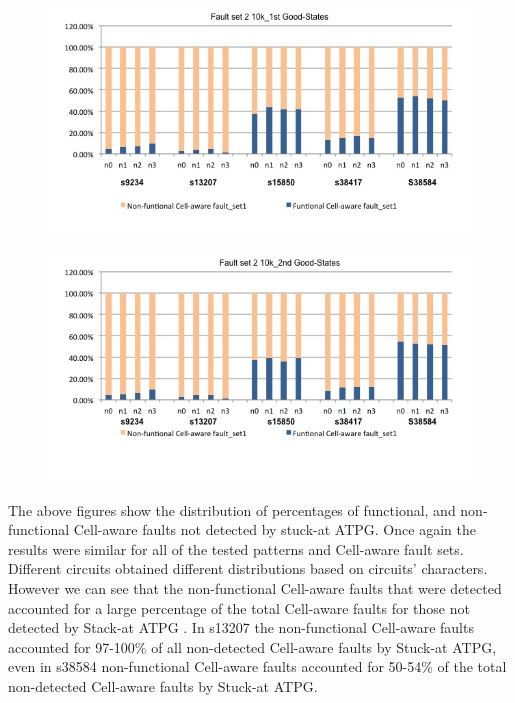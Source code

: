 \documentclass[10 pt, technote]{IEEEtran}
\begin{document}
\begin{figure}[H]
\includegraphics[scale=0.2,width = \linewidth]{../Figures/distribution_set2_10k_1st.jpg}
\end{figure}

\begin{figure}[H]
\includegraphics[scale=0.2,width = \linewidth]{../Figures/distribution_set2_10k_2nd.jpg}
\end{figure}

The above figures show the distribution of percentages of functional, and non-functional Cell-aware faults not detected by stuck-at ATPG. Once again the results were similar for all of the tested patterns and Cell-aware fault sets. Different circuits obtained different distributions based on circuits’ characters. However we can see that the non-functional Cell-aware faults that were detected accounted for a large percentage of the total Cell-aware faults for those not detected by Stack-at ATPG . In s13207 the non-functional Cell-aware faults accounted for 97-100\% of all non-detected Cell-aware faults by Stuck-at ATPG, even in s38584 non-functional Cell-aware faults accounted for 50-54\% of the total non-detected Cell-aware faults by Stuck-at ATPG. 
\end{document}

